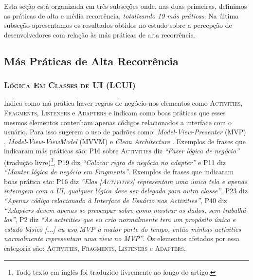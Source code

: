 Esta seção está organizada em três subseções onde, nas duas primeiras, definimos as práticas de alta e média recorrência, \emph{totalizando 19 más práticas}. Na última subseção apresentamos os resultados obtidos no estudo sobre a percepção de desenvolvedores com relação às más práticas de alta recorrência. 


\subsection{Más Práticas de Alta Recorrência}

\subsubsection{\textsc{Lógica Em Classes de UI (LCUI)}}
Indica como má prática haver regras de negócio nos elementos como \textsc{Activities}, \textsc{Fragments}, \textsc{Listeners} e \textsc{Adapters} e indicam como boas práticas que esses mesmos elementos contenham apenas códigos relacionados a interface com o usuário. Para isso sugerem o uso de padrões como: \textit{Model-View-Presenter} (MVP) \cite{MartinFowlerGUIArchitectures, WikipediaMVP}, \textit{Model-View-ViewModel} (MVVM) \cite{WikipediaMVVM} e \textit{Clean Architecture} \cite{CleanArchitecture}. Exemplos de frases que indicaram más práticas são: P16 sobre \textsc{Activities} diz \textit{``Fazer lógica de negócio''} (tradução livre)\footnote{Todo texto em inglês foi traduzido livremente ao longo do artigo.}, P19 diz \textit{``Colocar regra de negócio no adapter''} e P11 diz \textit{``Manter lógica de negócio em Fragments''}. Exemplos de frases que indicaram boas prática são: P16 diz \textit{``Elas [\textsc{Activities}] representam uma única tela e apenas interagem com a UI, qualquer lógica deve ser delegada para outra classe''}, P23 diz \textit{``Apenas código relacionado à Interface de Usuário nas Activities''}, P40 diz \textit{``Adapters devem apenas se preocupar sobre como mostrar os dados, sem trabalhá-los''}, P2 diz \textit{``As activities que eu crio normalmente tem um propósito único e estado básico [...] eu uso MVP a maior parte do tempo, então minhas activities normalmente representam uma view no MVP''}. Os elementos afetados por essa categoria são: \textsc{Activities}, \textsc{Fragments}, \textsc{Listeners} e \textsc{Adapters}. 


